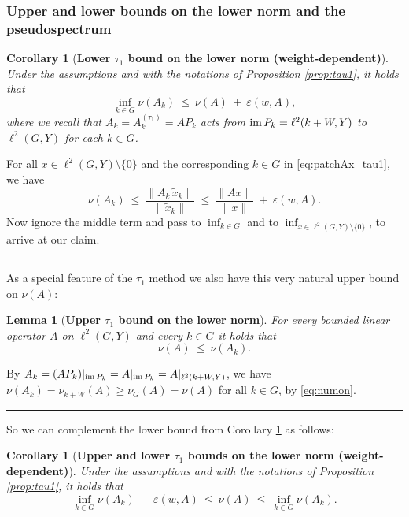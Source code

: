\documentclass{article}
\newcommand\eps{{\varepsilon}}
\newcommand\im{{\rm im\,}}
\newtheorem{lemma}[theorem]{Lemma}
\newtheorem{corollary}[theorem]{Corollary}
\newcommand\Proofend{\rule{2mm}{2mm}}
\renewenvironment{proof}
 {\par\noindent{\bf Proof.}}
 {\Proofend\par\pagebreak[2]}
\numberwithin{equation}{section}   %
\numberwithin{figure}{section}  %
\begin{document}





\subsubsection{Upper and lower bounds on the lower norm and the pseudospectrum} \label{sec:bounds_tau1}

\begin{corollary}[\bf Lower $\tau_1$ bound on the lower norm (weight-dependent)] \label{cor:tau1}
Under the assumptions and with the notations of Proposition \ref{prop:tau1}, it holds that
\[
\inf_{k\in G}\nu(A_k)\ \le\ \nu(A)\ +\ \eps(w,A),
\]
where we recall that $A_k=A_k^{(\tau_1)}=AP_k$ acts from $\im P_k=\ell^2(k+W,Y)$ to $\ell^2(G,Y)$ for each $k\in G$.
\end{corollary}
\begin{proof}
For all $x\in \ell^2(G,Y)\setminus\{0\}$ and the corresponding $k\in G$ in \eqref{eq:patchAx_tau1}, we have
\[
\nu(A_k)\ \le\ \frac{\|A_{k}\, \tilde x_{k}\|}{\| \tilde x_{k}\|}\ \le\ \frac{\|Ax\|}{\|x\|}\ +\ \eps(w,A).
\]
Now ignore the middle term and pass to $\inf_{k\in G}$ and to $\inf_{x\in \ell^2(G,Y)\setminus\{0\}}$, to arrive at our claim.
\end{proof}

As a special feature of the $\tau_1$ method we also have this very natural upper bound on $\nu(A)$:

\begin{lemma}[\bf Upper $\tau_1$ bound on the lower norm] \label{lem:upper_tau1}
For every bounded linear operator $A$ on $\ell^2(G,Y)$ and every $k\in G$ it holds that
\[
\nu(A)\ \le\ \nu(A_k).
\]
\end{lemma}
\begin{proof}
By $A_k=(AP_k)|_{\im P_k}=A|_{\im P_k}=A|_{\ell^2(k+W,Y)}$, we have $\nu(A_k)=\nu_{k+W}(A)\ge\nu_G(A)=\nu(A)$ for all $k\in G$, by \eqref{eq:numon}.
\end{proof}

So we can complement the lower bound from Corollary \ref{cor:tau1} as follows:
%
\begin{corollary}[\bf Upper and lower $\tau_1$ bounds on the lower norm (weight-dependent)] \label{cor:tau1_sandwich_w}
Under the assumptions and with the notations of Proposition \ref{prop:tau1}, it holds that
\[
\inf_{k\in G}\nu(A_k)\ -\ \eps(w,A)\ \le\ \nu(A)\ \le\ \inf_{k\in G}\nu(A_k).
\]
\end{corollary}
\end{document}
